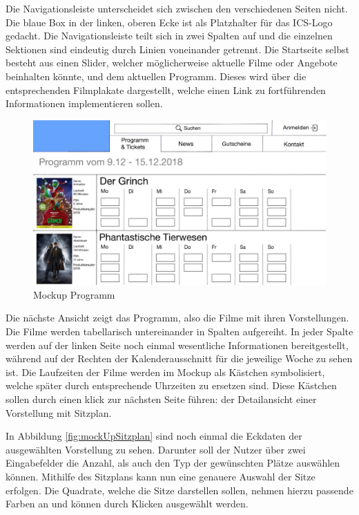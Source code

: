 		Die Navigationsleiste unterscheidet sich zwischen den verschiedenen Seiten nicht. Die blaue Box in der linken, oberen Ecke ist als Platzhalter für das \ac{ICS}-Logo gedacht. Die Navigationsleiste teilt sich in zwei Spalten auf und die einzelnen Sektionen sind eindeutig durch Linien voneinander getrennt. Die Startseite selbst besteht aus einen Slider, welcher möglicherweise aktuelle Filme oder Angebote beinhalten könnte, und dem aktuellen Programm. Dieses wird über die entsprechenden Filmplakate dargestellt, welche einen Link zu fortführenden Informationen implementieren sollen.
		
		\begin{figure}[H]
			\centering 
			\includegraphics[width=12cm]{img/mockUp2.png}
			\captionsetup{format=hang}
			\caption[Mockup Programm]{\label{fig:mockUpProgramm} Mockup Programm }
		\end{figure}
		
		Die nächste Ansicht zeigt das Programm, also die Filme mit ihren Vorstellungen. Die Filme werden tabellarisch untereinander in Spalten aufgereiht. In jeder Spalte werden auf der linken Seite noch einmal wesentliche Informationen bereitgestellt, während auf der Rechten der Kalenderausschnitt für die jeweilige Woche zu sehen ist. Die Laufzeiten der Filme werden im Mockup als Kästchen symbolisiert, welche später durch entsprechende Uhrzeiten zu ersetzen sind. Diese Kästchen sollen durch einen klick zur nächsten Seite führen: der Detailansicht einer Vorstellung mit Sitzplan.
		
		In Abbildung \ref{fig:mockUpSitzplan} sind noch einmal die Eckdaten der ausgewählten Vorstellung zu sehen. Darunter soll der Nutzer über zwei Eingabefelder die Anzahl, als auch den Typ der gewünschten Plätze auswählen können. Mithilfe des Sitzplans kann nun eine genauere Auswahl der Sitze erfolgen. Die Quadrate, welche die Sitze darstellen sollen, nehmen hierzu passende Farben an und können durch Klicken ausgewählt werden.
		
